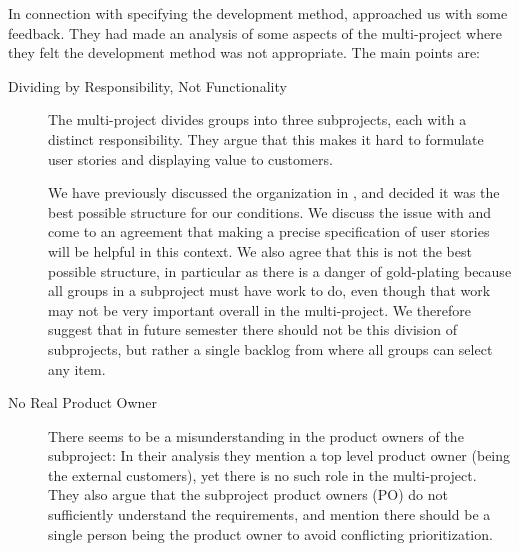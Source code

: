 In connection with specifying the development method,  approached us with some feedback. They had made an analysis of some aspects of the multi-project where they felt the development method was not appropriate. The main points are:
\begin{description}
  \item[Dividing by Responsibility, Not Functionality] The multi-project divides groups into three subprojects, each with a distinct responsibility. They argue that this makes it hard to formulate user stories and displaying value to customers.

  We have previously discussed the organization in , and decided it was the best possible structure for our conditions. We discuss the issue with  and come to an agreement that making a precise specification of user stories will be helpful in this context. We also agree that this is not the best possible structure, in particular as there is a danger of gold-plating because all groups in a subproject must have work to do, even though that work may not be very important overall in the multi-project. We therefore suggest that in future semester there should not be this division of subprojects, but rather a single backlog from where all groups can select any item.
  \item[No Real Product Owner] There seems to be a misunderstanding in the product owners of the subproject: In their analysis they mention a top level product owner (being the external customers), yet there is no such role in the multi-project. They also argue that the subproject product owners (PO) do not sufficiently understand the requirements, and mention there should be a single person being the product owner to avoid conflicting prioritization.


\end{description}
